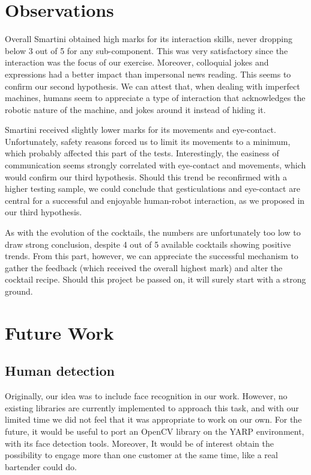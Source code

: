 \documentclass[conference]{IEEEtran}
\begin{document}
\section{Observations}

Overall Smartini obtained high marks for its interaction skills, never dropping below 3 out of 5 for any sub-component. This was very satisfactory since the interaction was the focus of our exercise. Moreover, colloquial jokes and expressions had a better impact than impersonal news reading. This seems to confirm our second hypothesis. We can attest that, when dealing with imperfect machines, humans seem to appreciate a type of interaction that acknowledges the robotic nature of the machine, and jokes around it instead of hiding it. 

Smartini received slightly lower marks for its movements and eye-contact. Unfortunately, safety reasons forced us to limit its movements to a minimum, which probably affected this part of the tests. Interestingly, the easiness of communication seems strongly correlated with eye-contact and movements, which would confirm our third hypothesis. Should this trend be reconfirmed with a higher testing sample, we could conclude that gesticulations and eye-contact are central for a successful and enjoyable human-robot interaction, as we proposed in our third hypothesis. 

As with the evolution of the cocktails, the numbers are unfortunately too low to draw strong conclusion, despite 4 out of 5 available cocktails showing positive trends. From this part, however, we can appreciate the successful mechanism to gather the feedback (which received the overall highest mark) and alter the cocktail recipe. Should this project be passed on, it will surely start with a strong ground. 

\section{Future Work}

\subsection{Human detection}

Originally, our idea was to include face recognition in our work. However, no existing libraries are currently implemented to approach this task, and with our limited time we did not feel that it was appropriate to work on our own. For the future, it would be useful to port an OpenCV library on the YARP environment, with its face detection tools. Moreover, It would be of interest obtain the possibility to engage more than one customer at the same time, like a real bartender could do.
\end{document}

